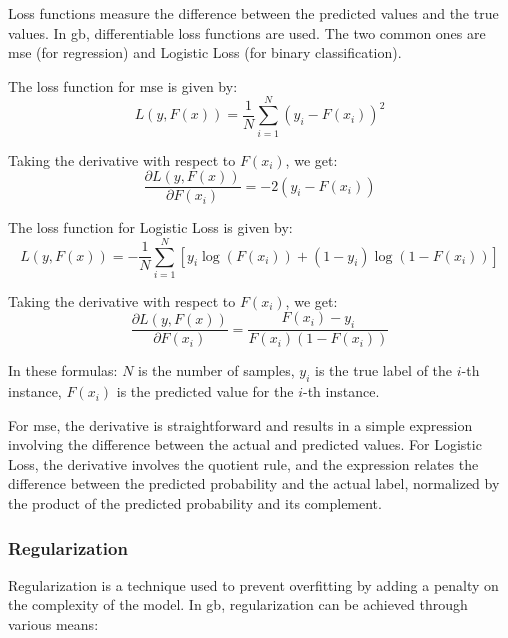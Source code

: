 Loss functions measure the difference between the predicted values and the true values. In \acrlong{gb}, differentiable loss functions are used. The two common ones are \Gls{mse} (for regression) and Logistic Loss (for binary classification).

The loss function for \gls{mse} is given by:
\begin{equation}
L(y, F(x)) = \frac{1}{N} \sum_{i=1}^N (y_i - F(x_i))^2
\end{equation}

Taking the derivative with respect to \( F(x_i) \), we get:
\begin{equation}
\frac{\partial L(y, F(x))}{\partial F(x_i)} = -2(y_i - F(x_i))
\end{equation}

The loss function for Logistic Loss is given by:
\begin{equation}
L(y, F(x)) = - \frac{1}{N} \sum_{i=1}^N [ y_i \log(F(x_i)) + (1-y_i) \log(1-F(x_i)) ]
\end{equation}

Taking the derivative with respect to \( F(x_i) \), we get:
\begin{equation}
\frac{\partial L(y, F(x))}{\partial F(x_i)} = \frac{F(x_i) - y_i}{F(x_i)(1 - F(x_i))}
\end{equation}

In these formulas: \( N \) is the number of samples, \( y_i \) is the true label of the \( i \)-th instance, \( F(x_i) \) is the predicted value for the \( i \)-th instance.

For \gls{mse}, the derivative is straightforward and results in a simple expression involving the difference between the actual and predicted values.
For Logistic Loss, the derivative involves the quotient rule, and the expression relates the difference between the predicted probability and the actual label, normalized by the product of the predicted probability and its complement.


\subsubsection{Regularization}

Regularization is a technique used to prevent overfitting by adding a penalty on the complexity of the model. In \acrlong{gb}, regularization can be achieved through various means:

